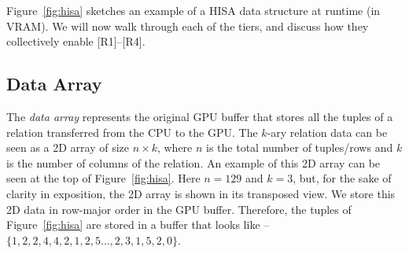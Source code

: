 \documentclass[nonacm,sigplan]{acmart}
\begin{document}

Figure~\ref{fig:hisa} sketches an example of a HISA data structure at runtime (in VRAM). We will now walk through each of the tiers, and discuss how they collectively enable [R1]--[R4]. 






\subsection{Data Array} 
The \emph{data array} represents the original GPU buffer that stores all the tuples of a relation transferred from the CPU to the GPU.
The $k$-ary relation data can be seen as a 2D array of size $n \times k$, where $n$ is the total number of tuples/rows and $k$ is the number of columns of the relation. An example of this 2D array can be seen at the top of Figure~\ref{fig:hisa}. Here $n = 129$ and $k = 3$, but, for the sake of clarity in exposition, the 2D array is shown in its transposed view. We store this 2D data in row-major order in the GPU buffer. Therefore, the tuples of Figure~\ref{fig:hisa} are stored in a buffer that looks like -- $\{1, 2, 2, 4, 4, 2, 1, 2, 5 \dots, 2, 3, 1, 5, 2, 0\}$.
\end{document}
